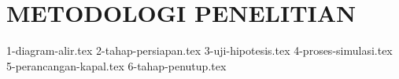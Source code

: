 \chapter{METODOLOGI PENELITIAN}
\label{chap:metodologi}

{1-diagram-alir.tex}
{2-tahap-persiapan.tex}
{3-uji-hipotesis.tex}
{4-proses-simulasi.tex}
{5-perancangan-kapal.tex}
{6-tahap-penutup.tex}
